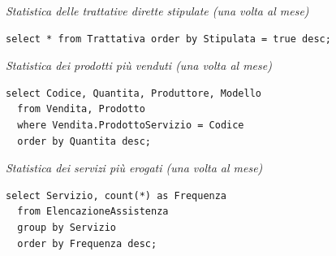 \noindent\textit{Statistica delle trattative dirette stipulate (una volta al mese)}
\begin{verbatim}
select * from Trattativa order by Stipulata = true desc;
\end{verbatim}
\vspace{0.5cm}

\noindent{}
\newline\newline

\noindent\textit{Statistica dei prodotti più venduti (una volta al mese)}
\begin{verbatim}
select Codice, Quantita, Produttore, Modello
  from Vendita, Prodotto
  where Vendita.ProdottoServizio = Codice
  order by Quantita desc;
\end{verbatim}
\vspace{0.5cm}

\noindent{}
\newline\newline

\noindent\textit{Statistica dei servizi più erogati (una volta al mese)}
\begin{verbatim}
select Servizio, count(*) as Frequenza
  from ElencazioneAssistenza
  group by Servizio
  order by Frequenza desc;
\end{verbatim}
\vspace{0.5cm}

\noindent{}
\newline\newline

